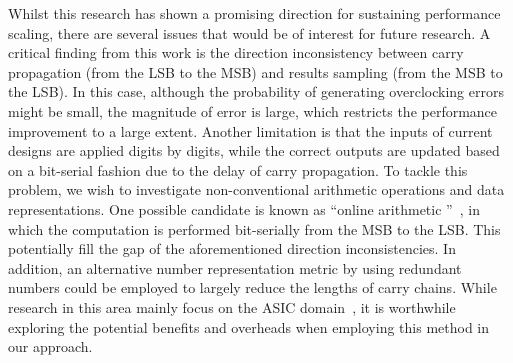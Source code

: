 \documentclass[prodmode,acmtrets]{acmsmall} %
\begin{document}
Whilst this research has shown a promising direction for sustaining performance scaling, there are several issues that would be of interest for future research. A critical finding from this work is the direction inconsistency between carry propagation (from the LSB to the MSB) and results sampling (from the MSB to the LSB). In this case, although the probability of generating overclocking errors might be small, the magnitude of error is large, which restricts the performance improvement to a large extent. Another limitation is that the inputs of current designs are applied digits by digits, while the correct outputs are updated based on a bit-serial fashion due to the delay of carry propagation.  To tackle this problem, we wish to investigate non-conventional arithmetic operations and data representations. One possible candidate is known as ``online arithmetic ''~\cite{Ercegovac_Overview,Ercegovac_Book}, in which the computation is performed bit-serially from the MSB to the LSB. This potentially fill the gap of the aforementioned direction inconsistencies. In addition, an alternative number representation metric by using redundant numbers could be employed to largely reduce the lengths of carry chains. While research in this area mainly focus on the ASIC domain~\cite{RedundantMult_1985,RedundantMult_1987}, it is worthwhile exploring the potential benefits and overheads when employing this method in our approach.








\end{document}

